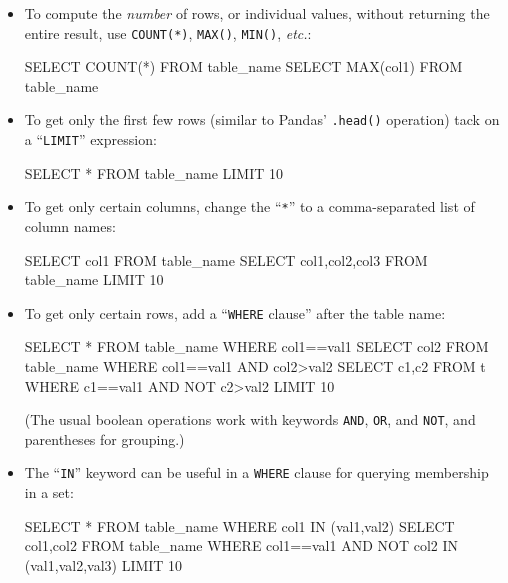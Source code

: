 \begin{itemize}
\itemsep1em
\item To compute the \textit{number} of rows, or individual values, without
returning the entire result, use \texttt{COUNT(*)}, \texttt{MAX()},
\texttt{MIN()}, \textit{etc.}:

\begin{ShadedCode}
SELECT COUNT(*) FROM table_name
SELECT MAX(col1) FROM table_name
\end{ShadedCode}

\item To get only the first few rows (similar to Pandas' \texttt{.head()}
operation) tack on a ``\texttt{LIMIT}'' expression:

\begin{ShadedCode}
SELECT * FROM table_name LIMIT 10
\end{ShadedCode}

\item To get only certain columns, change the ``\texttt{*}'' to a
comma-separated list of column names:

\begin{ShadedCode}
SELECT col1 FROM table_name
SELECT col1,col2,col3 FROM table_name LIMIT 10
\end{ShadedCode}

\item To get only certain rows, add a ``\texttt{WHERE} clause'' after the table
name:

\begin{ShadedCodeFn}
SELECT * FROM table_name WHERE col1==val1
SELECT col2 FROM table_name WHERE col1==val1 AND col2>val2
SELECT c1,c2 FROM t WHERE c1==val1 AND NOT c2>val2 LIMIT 10
\end{ShadedCodeFn}

(The usual boolean operations work with keywords \texttt{AND}, \texttt{OR},
and \texttt{NOT}, and parentheses for grouping.)

\item The ``\texttt{IN}'' keyword can be useful in a \texttt{WHERE} clause
for querying membership in a set:

\begin{ShadedCode}
SELECT * FROM table_name WHERE col1 IN (val1,val2)
SELECT col1,col2 FROM table_name WHERE col1==val1 AND
            NOT col2 IN (val1,val2,val3) LIMIT 10
\end{ShadedCode}


\end{itemize}
